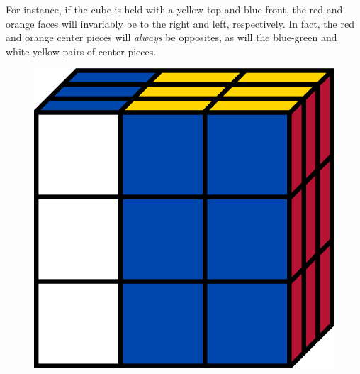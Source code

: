 \documentclass[12pt]{article}
\begin{document}
For instance, if the cube is held with a yellow top and blue front, the red and orange faces will invariably be to the right and left, respectively. In fact, the red and orange center pieces will \textit{always} be opposites, as will the blue-green and white-yellow pairs of center pieces.\\

\begin{figure}[h]
    \centering
    \begin{minipage}[c]{0.2\textwidth}
        \includegraphics[scale=0.1]{moves/cubeLp.png}
    \end{minipage}
    \begin{minipage}[c]{0.05\textwidth}
        \centering
    \end{minipage}
    \hspace{0.5cm}
    \begin{minipage}[c]{0.2\textwidth}

\end{minipage}
\end{figure}
\end{document}
